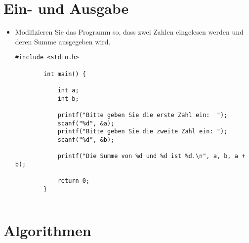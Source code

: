 \documentclass[]{article}
\begin{document}
	

	\section{Ein- und Ausgabe}
	
	\begin{itemize}	
	
	\item Modifizieren Sie das Programm so, dass zwei Zahlen eingelesen werden und deren Summe ausgegeben wird.
	
	\begin{lstlisting}[gobble=4]
		#include <stdio.h>
		
		int main() {
			
			int a;
			int b;
			
			printf("Bitte geben Sie die erste Zahl ein:  ");
			scanf("%d", &a);
			printf("Bitte geben Sie die zweite Zahl ein: ");
			scanf("%d", &b);			
			
			printf("Die Summe von %d und %d ist %d.\n", a, b, a + b);
			
			return 0;
		}
		
	\end{lstlisting}

	
	\end{itemize}
	
	\section{Algorithmen}
	
\end{document}
